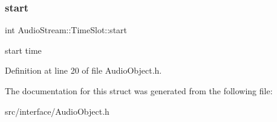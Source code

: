\mbox{\label{struct_audio_stream_1_1_time_slot_ae5191a76f4255eec3ea4fb6f7c3a5246}} 
\subsubsection{\texorpdfstring{start}{start}}
{\footnotesize\ttfamily int Audio\+Stream\+::\+Time\+Slot\+::start}

start time 

Definition at line 20 of file Audio\+Object.\+h.



The documentation for this struct was generated from the following file\+:\begin{DoxyCompactItemize}
\item 
src/interface/Audio\+Object.\+h\end{DoxyCompactItemize}
